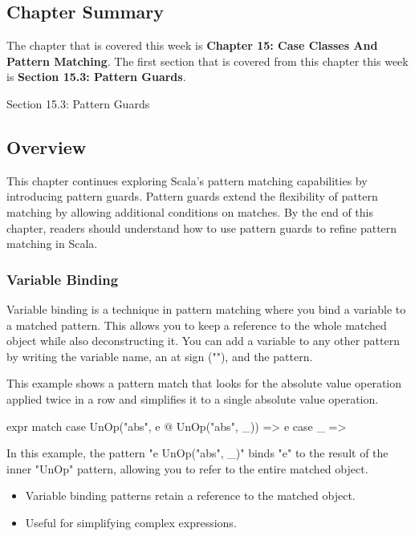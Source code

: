 \subsection{Chapter Summary}

The chapter that is covered this week is \textbf{Chapter 15: Case Classes And Pattern Matching}. The first section that is covered from this chapter this week is \textbf{Section 15.3: Pattern Guards}.

\begin{notes}{Section 15.3: Pattern Guards}
    \subsection*{Overview}

    This chapter continues exploring Scala's pattern matching capabilities by introducing pattern guards. Pattern guards extend the flexibility of pattern matching by allowing additional conditions 
    on matches. By the end of this chapter, readers should understand how to use pattern guards to refine pattern matching in Scala.
    
    \subsubsection*{Variable Binding}
    
    Variable binding is a technique in pattern matching where you bind a variable to a matched pattern. This allows you to keep a reference to the whole matched object while also deconstructing it. 
    You can add a variable to any other pattern by writing the variable name, an at sign ("\@"), and the pattern.
    
    \begin{highlight}
    
        This example shows a pattern match that looks for the absolute value operation applied twice in a row and simplifies it to a single absolute value operation.
    
    \begin{code}[Scala]
    expr match {
        case UnOp("abs", e @ UnOp("abs", _)) => e
        case _ =>
    }
    \end{code}
    
        In this example, the pattern "e \@ UnOp("abs", \_)" binds "e" to the result of the inner "UnOp" pattern, allowing you to refer to the entire matched object.
    
        \begin{itemize}
            \item Variable binding patterns retain a reference to the matched object.
            \item Useful for simplifying complex expressions.
        \end{itemize}
    

\end{highlight}
\end{notes}
